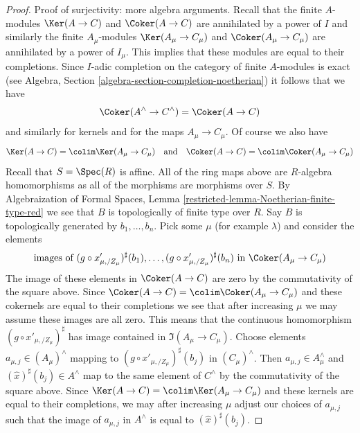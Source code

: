 \begin{proof}
\medskip\noindent
Proof of surjectivity: more algebra arguments. Recall that the finite
$A$-modules $\Ker(A \to C)$ and $\Coker(A \to C)$ are annihilated
by a power of $I$ and similarly the finite $A_\mu$-modules
$\Ker(A_\mu \to C_\mu)$ and $\Coker(A_\mu \to C_\mu)$ are annihilated
by a power of $I_\mu$. This implies that these modules are
equal to their completions. Since $I$-adic completion on the category of
finite $A$-modules is exact (see
Algebra, Section \ref{algebra-section-completion-noetherian})
it follows that we have
$$
\Coker(A^\wedge \to C^\wedge) = \Coker(A \to C)
$$
and similarly for kernels and for the maps $A_\mu \to C_\mu$.
Of course we also have
$$
\Ker(A \to C) = \colim \Ker(A_\mu \to C_\mu)
\quad\text{and}\quad
\Coker(A \to C) = \colim \Coker(A_\mu \to C_\mu)
$$
Recall that $S = \Spec(R)$ is affine. All of the ring maps
above are $R$-algebra homomorphisms as all of the morphisms
are morphisms over $S$. By
Algebraization of Formal Spaces, Lemma
\ref{restricted-lemma-Noetherian-finite-type-red}
we see that $B$ is topologically of finite type over $R$.
Say $B$ is topologically generated by $b_1, \ldots, b_n$.
Pick some $\mu$ (for example $\lambda$) and consider
the elements
$$
\text{images of }
(g \circ x'_{\mu, /Z_\mu})^\sharp(b_1)
, \ldots,
(g \circ x'_{\mu, /Z_\mu})^\sharp(b_n)
\text{ in }\Coker(A_\mu \to C_\mu)
$$
The image of these elements in $\Coker(A \to C)$ are zero
by the commutativity of the square above. Since
$\Coker(A \to C) = \colim \Coker(A_\mu \to C_\mu)$ and these
cokernels are equal to their completions
we see that after increasing $\mu$ we may assume these
images are all zero. This means that the continuous
homomorphism $(g \circ x'_{\mu, /Z_\mu})^\sharp$ has image contained
in $\Im(A_\mu \to C_\mu)$.
Choose elements $a_{\mu, j} \in (A_\mu)^\wedge$ mapping to
$(g \circ x'_{\mu, /Z_\mu})^\sharp(b_j)$ in $(C_\mu)^\wedge$.
Then $a_{\mu, j} \in A_\mu^\wedge$ and $(\hat x)^\sharp(b_j) \in A^\wedge$
map to the same element of $C^\wedge$ by the commutativity of the
square above. Since
$\Ker(A \to C) = \colim \Ker(A_\mu \to C_\mu)$ and these kernels
are equal to their completions, we may after increasing
$\mu$ adjust our choices of $a_{\mu, j}$ such that
the image of $a_{\mu, j}$ in $A^\wedge$ is equal to $(\hat x)^\sharp(b_j)$.


\end{proof}
